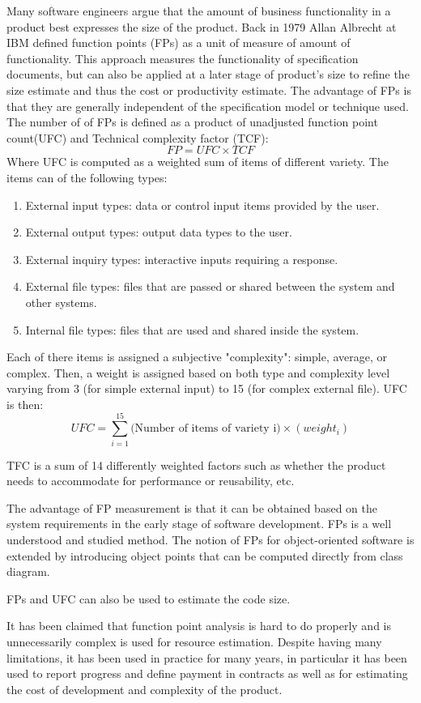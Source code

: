 \documentclass[11pt]{article}
\begin{document}
Many software engineers argue that the amount of business functionality in a product best expresses the size of the product. 
Back in 1979 Allan Albrecht at IBM defined function points (FPs) as a unit of measure of amount of functionality. This approach measures the functionality of specification documents, but can also be applied at a later stage of product's size to refine the size estimate and thus the cost or productivity estimate. The advantage of FPs is that they are generally independent of the specification model or technique used. The number of of FPs is defined as a product of unadjusted function point count(UFC) and Technical complexity factor (TCF): \[ FP = UFC \times TCF\]
Where UFC is computed as a weighted sum of items of different variety. The items can of the following types\cite{LEUNG-2001}:
\begin{enumerate}
	\item External input types: data or control input items provided by the user.
	\item External output types: output data types to the user.
	\item External inquiry types: interactive inputs requiring a response.
	\item External file types: files that are passed or shared between the system and other systems.
	\item Internal file types: files that are used and shared inside the system.
\end{enumerate}
Each of there items is assigned a subjective "complexity": simple, average, or complex. Then, a weight is assigned based on both type and complexity level varying from 3 (for simple external input) to 15 (for complex external file).
UFC is then: \[UFC=\sum_{i=1}^{15} \text{(Number of items of variety i)} \times (weight_i) \]
\par 
TFC is a sum of 14 differently weighted factors such as whether the product needs to accommodate for performance or reusability, etc.
\par
The advantage of FP measurement is that it can be obtained based on the system requirements in the early stage of software development. FPs is a well understood and studied method. The notion of FPs for object-oriented software is extended by introducing object points that can be computed directly from class diagram. 
\par
FPs and UFC can also be used to estimate the code size.
\par
It has been claimed that function point analysis is hard to do properly and is unnecessarily complex is used for resource estimation.\cite{Fenton:1999:SMS:329632.329641} Despite having many limitations, it has been used in practice for many years, in particular it has been used to report progress and define payment in contracts as well as for estimating the cost of development and complexity of the product.
\end{document}
